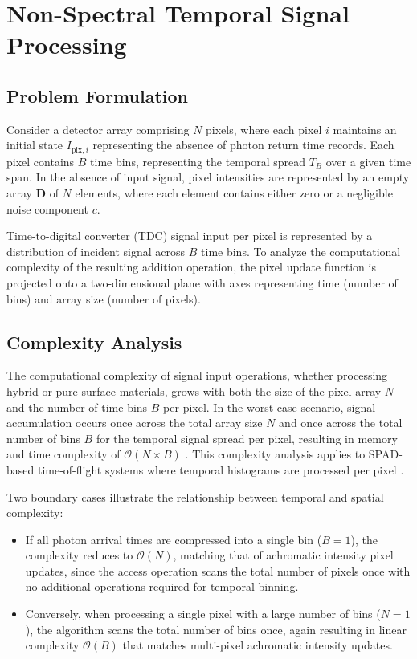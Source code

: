 \documentclass[10pt,twocolumn]{article}
\begin{document}
\section{Non-Spectral Temporal Signal Processing}

\subsection{Problem Formulation}

Consider a detector array comprising $N$ pixels, where each pixel $i$ maintains an initial state $I_{\text{pix},i}$ representing the absence of photon return time records. Each pixel contains $B$ time bins, representing the temporal spread $T_B$ over a given time span. In the absence of input signal, pixel intensities are represented by an empty array $\mathbf{D}$ of $N$ elements, where each element contains either zero or a negligible noise component $c$.

Time-to-digital converter (TDC) signal input per pixel is represented by a distribution of incident signal across $B$ time bins. To analyze the computational complexity of the resulting addition operation, the pixel update function is projected onto a two-dimensional plane with axes representing time (number of bins) and array size (number of pixels).

\subsection{Complexity Analysis}

The computational complexity of signal input operations, whether processing hybrid or pure surface materials, grows with both the size of the pixel array $N$ and the number of time bins $B$ per pixel. In the worst-case scenario, signal accumulation occurs once across the total array size $N$ and once across the total number of bins $B$ for the temporal signal spread per pixel, resulting in memory and time complexity of $\mathcal{O}(N \times B)$ \cite{knuth1976}. This complexity analysis applies to SPAD-based time-of-flight systems where temporal histograms are processed per pixel \cite{piron2020,tontini2020}.

Two boundary cases illustrate the relationship between temporal and spatial complexity:

\begin{itemize}
    \item If all photon arrival times are compressed into a single bin ($B = 1$), the complexity reduces to $\mathcal{O}(N)$, matching that of achromatic intensity pixel updates, since the access operation scans the total number of pixels once with no additional operations required for temporal binning.
    
    \item Conversely, when processing a single pixel with a large number of bins ($N = 1$), the algorithm scans the total number of bins once, again resulting in linear complexity $\mathcal{O}(B)$ that matches multi-pixel achromatic intensity updates.
\end{itemize}
\end{document}
